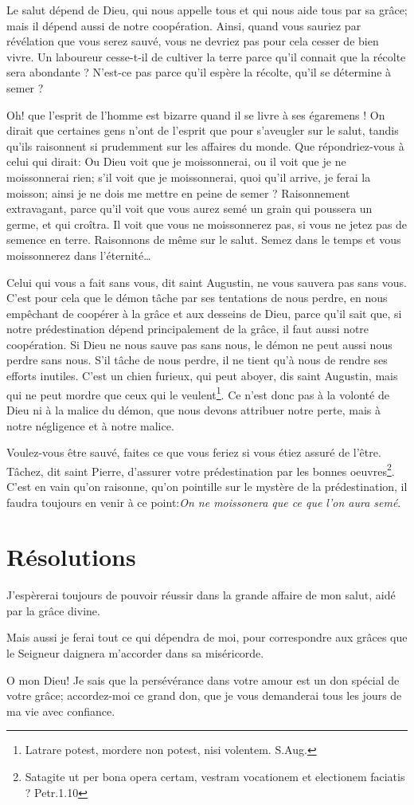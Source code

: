 \documentclass[instructions.tex]{subfiles}
\begin{document}
\secundo Le salut dépend de Dieu, qui nous appelle tous et qui nous aide tous par sa grâce; mais il dépend aussi de notre coopération. Ainsi, quand vous sauriez par révélation que vous serez sauvé, vous ne devriez pas pour cela cesser de bien vivre. Un laboureur cesse-t-il de cultiver la terre parce qu'il connait que la récolte sera abondante ? N'est-ce pas parce qu'il espère la récolte, qu'il se détermine à semer ? 

Oh! que l'esprit de l'homme est bizarre quand il se livre à ses égaremens ! On dirait que certaines gens n'ont de l'esprit que pour s'aveugler sur le salut, tandis qu'ils raisonnent si prudemment sur les affaires du monde. Que répondriez-vous à celui qui dirait: Ou Dieu voit que je moissonnerai, ou il voit que je ne moissonnerai rien; s'il voit que je moissonnerai, quoi qu'il arrive, je ferai la moisson; ainsi je ne dois me mettre en peine de semer ? Raisonnement extravagant, parce qu'il voit que vous aurez semé un grain qui poussera un germe, et qui croîtra. Il voit que vous ne moissonnerez pas, si vous ne jetez pas de semence en terre. Raisonnons de même sur le salut. Semez dans le temps et vous moissonnerez dans l'éternité\dots

\og Celui qui vous a fait sans vous\fg, dit saint Augustin, \og ne vous sauvera pas sans vous\fg. C'est pour cela que le démon tâche par ses tentations de nous perdre, en nous empêchant de coopérer à la grâce et aux desseins de Dieu, parce qu'il sait que, si notre prédestination dépend principalement de la grâce, il faut aussi notre coopération. Si Dieu ne nous sauve pas sans nous, le démon ne peut aussi nous perdre sans nous. S'il tâche de nous perdre, il ne tient qu'à nous de rendre ses efforts inutiles. C'est un chien furieux, qui peut aboyer, dis saint Augustin, mais qui ne peut mordre que ceux qui le veulent\footnote{Latrare potest, mordere non potest, nisi volentem. S.Aug.}. Ce n'est donc pas à la volonté de Dieu ni à la malice du démon, que nous devons attribuer notre perte, mais à notre négligence et à notre malice. 

Voulez-vous être sauvé, faites ce que vous feriez si vous étiez assuré de l'être. Tâchez, dit saint Pierre, d'assurer votre prédestination par les bonnes oeuvres\footnote{Satagite ut per bona opera certam, vestram vocationem et electionem faciatis ? Petr.1.10}. C'est en vain qu'on raisonne, qu'on pointille sur le mystère de la prédestination, il faudra toujours en venir à ce point:\textit{On ne moissonera que ce que l'on aura semé}. 

\section{Résolutions}

\primo J'espèrerai toujours de pouvoir réussir dans la grande affaire de mon salut, aidé par la grâce divine. 

\secundo Mais aussi je ferai tout ce qui dépendra de moi, pour correspondre aux grâces que le Seigneur daignera m'accorder dans sa miséricorde.

O mon Dieu! Je sais que la persévérance dans votre amour est un don spécial de votre grâce; accordez-moi ce grand don, que je vous demanderai tous les jours de ma vie avec confiance.
\end{document}
